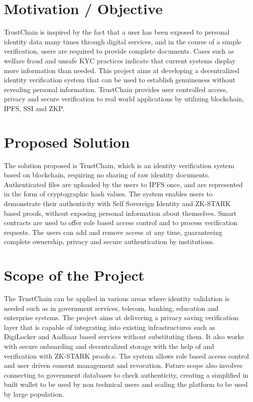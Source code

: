 \section{Motivation / Objective}
TrustChain is inspired by the fact that a user has been exposed to personal identity data many times through digital services, and in the course of a simple verification, users are required to provide complete documents. Cases such as welfare fraud and unsafe KYC practices indicate that current systems display more information than needed. This project aims at developing a decentralized identity verification system that can be used to establish genuineness without revealing personal information. TrustChain provides user controlled access, privacy and secure verification to real world applications by utilizing blockchain, IPFS, SSI and ZKP. 

\section{Proposed Solution}
The solution proposed is TrustChain, which is an identity verification system based on blockchain, requiring no sharing of raw identity documents. Authenticated files are uploaded by the users to IPFS once, and are represented in the form of cryptographic hash values. The system enables users to demonstrate their authenticity with Self Sovereign Identity and ZK-STARK based proofs, without exposing personal information about themselves. Smart contracts are used to offer role based access control and to process verification requests. The users can add and remove access at any time, guaranteeing complete ownership, privacy and secure authentication by institutions.

\section{Scope of the Project}
The TrustChain can be applied in various areas where identity validation is needed such as in government services, telecom, banking, education and enterprise systems. The project aims at delivering a privacy saving verification layer that is capable of integrating into existing infrastructures such as DigiLocker and Aadhaar based services without substituting them. It also works with secure onboarding and decentralized storage with the help of and verification with ZK-STARK proofs.s. The system allows role based access control and user driven consent management and revocation. Future scope also involves connecting to government databases to check authenticity, creating a simplified in built wallet to be used by non technical users and scaling the platform to be used by large population.

